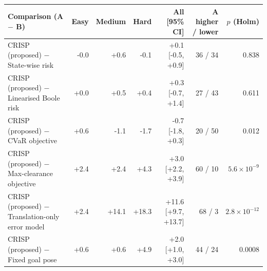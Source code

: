 \begin{tabular}{lrrrrrr}
\toprule
Comparison (A $-$ B) & Easy & Medium & Hard & All [95\% CI] & A higher / lower & $p$ (Holm) \\
\midrule
CRISP (proposed) $-$ State-wise risk & -0.0 & +0.6 & -0.1 & +0.1 [-0.5, +0.9] & 36 / 34 & 0.838 \\
CRISP (proposed) $-$ Linearised Boole risk & +0.0 & +0.5 & +0.4 & +0.3 [-0.7, +1.4] & 27 / 43 & 0.611 \\
CRISP (proposed) $-$ CVaR objective & +0.6 & -1.1 & -1.7 & -0.7 [-1.8, +0.3] & 20 / 50 & 0.012 \\
CRISP (proposed) $-$ Max-clearance objective & +2.4 & +2.4 & +4.3 & +3.0 [+2.2, +3.9] & 60 / 10 & $5.6\times10^{-9}$ \\
CRISP (proposed) $-$ Translation-only error model & +2.4 & +14.1 & +18.3 & +11.6 [+9.7, +13.7] & 68 / 3 & $2.8\times10^{-12}$ \\
CRISP (proposed) $-$ Fixed goal pose & +0.6 & +0.6 & +4.9 & +2.0 [+1.0, +3.0] & 44 / 24 & 0.0008 \\
\bottomrule
\end{tabular}
